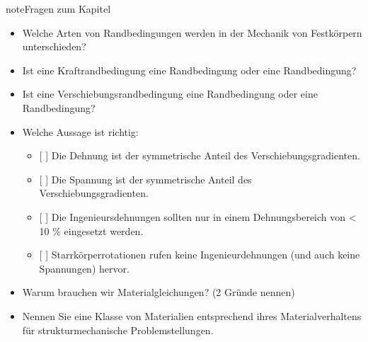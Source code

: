 \documentclass[letterpaper,10pt,german]{jupyterBook}
\begin{document}
\begin{sphinxadmonition}{note}{Fragen zum Kapitel}
\begin{itemize}
\item {} 
\sphinxAtStartPar
Welche Arten von Randbedingungen werden in der Mechanik von Festkörpern unterschieden?

\item {} 
\sphinxAtStartPar
Ist eine Kraftrandbedingung eine \sphinxhyphen{}Randbedingung oder eine \sphinxhyphen{}Randbedingung?

\item {} 
\sphinxAtStartPar
Ist eine Verschiebungsrandbedingung eine \sphinxhyphen{}Randbedingung oder eine \sphinxhyphen{}Randbedingung?

\end{itemize}



\sphinxAtStartPar
{}
\begin{itemize}
\item {} 
\sphinxAtStartPar
Welche Aussage ist richtig:
\begin{itemize}
\item {} 
\sphinxAtStartPar
{[} {]} Die Dehnung ist der symmetrische Anteil des Verschiebungsgradienten.

\item {} 
\sphinxAtStartPar
{[} {]} Die Spannung ist der symmetrische Anteil des Verschiebungsgradienten.

\item {} 
\sphinxAtStartPar
{[} {]} Die Ingenieursdehnungen sollten nur in einem Dehnungsbereich von < 10 \% eingesetzt werden.

\item {} 
\sphinxAtStartPar
{[} {]} Starrkörperrotationen rufen keine Ingenieurdehnungen (und auch keine Spannungen) hervor.

\end{itemize}

\end{itemize}

\sphinxAtStartPar
{}
\begin{itemize}
\item {} 
\sphinxAtStartPar
Warum brauchen wir Materialgleichungen? (2 Gründe nennen)

\item {} 
\sphinxAtStartPar
Nennen Sie eine Klasse von Materialien entsprechend ihres Materialverhaltens für strukturmechanische Problemstellungen.


\end{itemize}
\end{sphinxadmonition}
\end{document}
